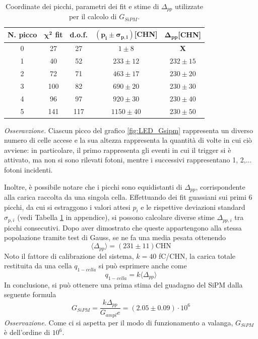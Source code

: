 \begin{table}[H]
    \centering
    \begin{tabular}{|c|c|c|c|c|}
        \hline
        
        \textbf{N. picco} & \textbf{$\mathbf{\chi^2}$ fit} & \textbf{d.o.f.} &$\mathbf{(p_i\pm\sigma_{p,i})}$\textbf{[CHN]} & $\mathbf{\Delta_{pp}}$\textbf{[CHN]} \\ \hline
        
        0   & 27 & 27 & $1\pm8$ & \textbf{X} \\ \hline
        1   & 40 & 52 & $233\pm12$    & $232\pm15$ \\ \hline
        2   & 72 & 71 & $463\pm17$    & $230\pm20$ \\ \hline        
        3   & 100 & 82 & $690\pm20$   & $230\pm30$ \\ \hline
        4   & 96 & 97 & $920\pm30$    & $230\pm40$ \\ \hline
        5   & 141 & 117 & $1150\pm40$ & $230\pm50$ \\ \hline
    \end{tabular}
    \caption{\footnotesize Coordinate dei picchi, parametri dei fit e stime di $\Delta_{pp}$ utilizzate per il calcolo di $G_{SiPM}$.}
    \label{tab:gsipm}   
\end{table}
\textit{Osseravzione.} Ciascun picco del grafico \ref{fig:LED_Gsipm} rappresenta un diverso numero di celle accese e la sua altezza rappresenta la quantità di volte in cui ciò avviene: in particolare, il primo rappresenta gli eventi in cui il trigger si è attivato, ma non si sono rilevati fotoni, mentre i successivi rappresentano 1, 2,... fotoni incidenti.

Inoltre, è possibile notare che i picchi sono equidistanti di $\Delta_{pp}$, corrispondente alla carica raccolta da una singola cella. Effettuando dei fit guassiani sui primi 6 picchi, da cui si estraggono i valori attesi $p_i$ e le rispettive deviazioni standard $\sigma_{p,i}$ (vedi Tabella \ref{tab:gsipm} in appendice), si possono calcolare diverse stime $\Delta_{pp, i}$ tra picchi consecutivi. Dopo aver dimostrato che queste appartengono alla stessa popolazione tramite test di Gauss, se ne fa una media pesata ottenendo $$ \langle\Delta_{pp}\rangle= (231  \pm  11 ) \text{CHN} $$
Noto il fattore di calibrazione del sistema, $k=40$ fC/CHN, la carica totale restituita da una cella $q_{1-cella}$ si può esprimere anche come $$q_{1-cella}=k\langle\Delta_{pp}\rangle$$
In conclusione, si può ottenere una prima stima del guadagno del SiPM dalla seguente formula 
\begin{equation}
    G_{SiPM}=\frac{k\Delta_{pp}}{G_{ampl}e}= (2.05  \pm  0.09 )\cdot10^6
    \label{eq:GSiPM}
\end{equation}
\textit{Osservazione.} Come ci si aspetta per il modo di funzionamento a valanga, $G_{SiPM}$ è dell'ordine di $10^6$. 

